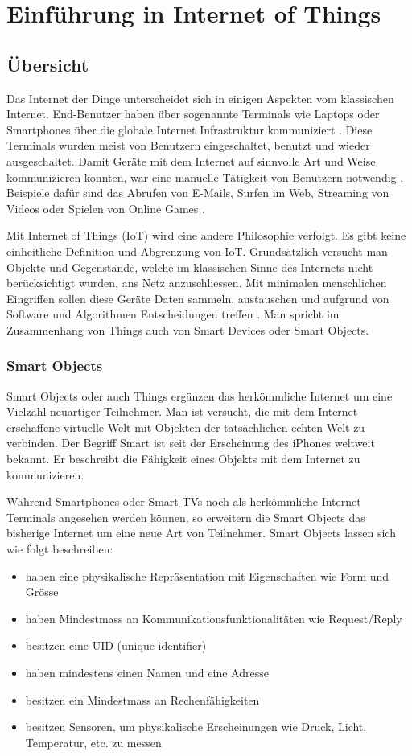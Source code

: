 \chapter{Einführung in Internet of Things}
\section{Übersicht}
Das Internet der Dinge unterscheidet sich in einigen Aspekten vom klassischen Internet. End-Benutzer haben über sogenannte Terminals wie Laptops oder Smartphones über die globale Internet Infrastruktur kommuniziert \cite{MiorandiSicariPellegriniChlamtac12}. Diese Terminals wurden meist von Benutzern eingeschaltet, benutzt und wieder ausgeschaltet. Damit Geräte mit dem Internet auf sinnvolle Art und Weise kommunizieren konnten, war eine manuelle Tätigkeit von Benutzern notwendig \cite{Radovici15}. Beispiele dafür sind das Abrufen von E-Mails, Surfen im Web, Streaming von Videos oder Spielen von Online Games \cite{MiorandiSicariPellegriniChlamtac12}.

Mit \glqq Internet of Things\grqq{} (IoT) wird eine andere Philosophie verfolgt. Es gibt keine einheitliche Definition und Abgrenzung von IoT. Grundsätzlich versucht man Objekte und Gegenstände, welche im klassischen Sinne des Internets nicht berücksichtigt wurden, ans Netz anzuschliessen. Mit minimalen menschlichen Eingriffen sollen diese Geräte Daten sammeln, austauschen und aufgrund von Software und Algorithmen Entscheidungen treffen \cite{RoseEldridgeChapin15}. Man spricht im Zusammenhang von \glqq Things \grqq{} auch von \glqq Smart Devices\grqq{} oder \glqq Smart Objects\grqq .
\subsection{Smart Objects}
Smart Objects oder auch \glqq Things\grqq{} ergänzen das herkömmliche Internet um eine Vielzahl neuartiger Teilnehmer. Man ist versucht, die mit dem Internet erschaffene virtuelle Welt mit Objekten der tatsächlichen \glqq echten\grqq{} Welt zu verbinden. Der Begriff \glqq Smart\grqq{} ist seit der Erscheinung des iPhones weltweit bekannt. Er beschreibt die Fähigkeit eines Objekts mit dem Internet zu kommunizieren. 


Während Smartphones oder Smart-TVs noch als herkömmliche Internet Terminals angesehen werden können, so erweitern die Smart Objects das bisherige Internet um eine neue Art von Teilnehmer. Smart Objects lassen sich wie folgt beschreiben:
\begin{itemize}
\item	haben eine physikalische Repräsentation mit Eigenschaften wie Form und Grösse
\item	haben Mindestmass an Kommunikationsfunktionalitäten wie Request/Reply
\item	besitzen eine UID (unique identifier)
\item	haben mindestens einen Namen und eine Adresse
\item	besitzen ein Mindestmass an Rechenfähigkeiten
\item	besitzen Sensoren, um physikalische Erscheinungen wie Druck, Licht, Temperatur, etc. zu messen
\end{itemize}

